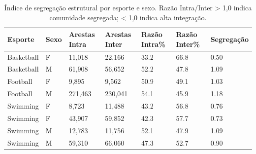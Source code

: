 \begin{table}[htbp]
\centering
\caption{Índice de segregação estrutural por esporte e sexo. Razão Intra/Inter > 1,0 indica comunidade segregada; < 1,0 indica alta integração.}
\label{tab:segregation}
\begin{tabular}{lllllll}
\hline
Esporte & Sexo & Arestas Intra & Arestas Inter & Razão Intra\% & Razão Inter\% & Segregação \\
\hline
Basketball & F & 11,018 & 22,166 & 33.2 & 66.8 & 0.50 \\
Basketball & M & 61,908 & 56,652 & 52.2 & 47.8 & 1.09 \\
Football & F & 9,895 & 9,562 & 50.9 & 49.1 & 1.03 \\
Football & M & 271,463 & 230,041 & 54.1 & 45.9 & 1.18 \\
Swimming & F & 8,723 & 11,488 & 43.2 & 56.8 & 0.76 \\
Swimming & F & 43,907 & 59,852 & 42.3 & 57.7 & 0.73 \\
Swimming & M & 12,783 & 11,756 & 52.1 & 47.9 & 1.09 \\
Swimming & M & 59,310 & 66,060 & 47.3 & 52.7 & 0.90 \\
\hline
\end{tabular}
\end{table}

